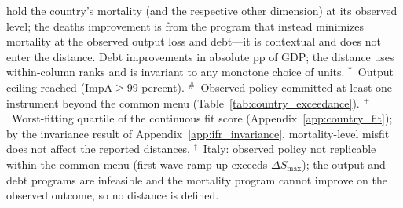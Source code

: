 \documentclass[12pt, a4paper]{article}
\begin{document}
\begin{table}[H]
\begin{minipage}{0.95\textwidth}
hold the country's mortality (and the respective other dimension) at its
observed level; the deaths improvement is from the program that instead
minimizes mortality at the observed output loss and debt---it is contextual
and does not enter the distance. Debt improvements in absolute pp of GDP; the
distance uses within-column ranks and is invariant to any monotone choice of
units. \(^{*}\)~Output ceiling reached (\(\text{ImpA} \ge 99\) percent).
\(^{\#}\)~Observed policy committed at least one instrument beyond the common
menu (Table~\ref{tab:country_exceedance}). \(^{+}\)~Worst-fitting quartile of
the continuous fit score (Appendix~\ref{app:country_fit}); by the invariance
result of Appendix~\ref{app:ifr_invariance}, mortality-level misfit does not
affect the reported distances. \(^{\dagger}\)~Italy: observed policy not
replicable within the common menu (first-wave ramp-up exceeds
\(\Delta S_{\max}\)); the output and debt programs are infeasible and the
mortality program cannot improve on the observed outcome, so no distance is
defined.
\end{minipage}
\end{table}
\end{document}
